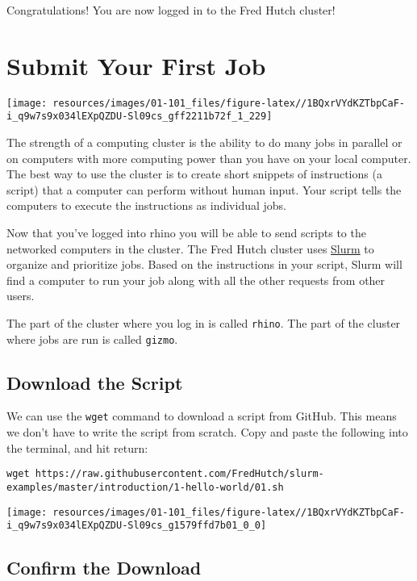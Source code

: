 \documentclass[
]{book}
\begin{document}
Congratulations! You are now logged in to the Fred Hutch cluster!

\hypertarget{submit-your-first-job}{%
\chapter{Submit Your First Job}\label{submit-your-first-job}}

\texttt{[image: resources/images/01-101\_files/figure-latex//1BQxrVYdKZTbpCaF-i\_q9w7s9x034lEXpQZDU-Sl09cs\_gff2211b72f\_1\_229]}

The strength of a computing cluster is the ability to do many jobs in parallel or on computers with more computing power than you have on your local computer. The best way to use the cluster is to create short snippets of instructions (a script) that a computer can perform without human input. Your script tells the computers to execute the instructions as individual jobs.

Now that you've logged into rhino you will be able to send scripts to the networked computers in the cluster. The Fred Hutch cluster uses \href{https://slurm.schedmd.com/overview.html}{Slurm} to organize and prioritize jobs. Based on the instructions in your script, Slurm will find a computer to run your job along with all the other requests from other users.

The part of the cluster where you log in is called \texttt{rhino}. The part of the cluster where jobs are run is called \texttt{gizmo}.

\hypertarget{download-the-script}{%
\section{Download the Script}\label{download-the-script}}

We can use the \texttt{wget} command to download a script from GitHub. This means we don't have to write the script from scratch. Copy and paste the following into the terminal, and hit return:

\begin{verbatim}
wget https://raw.githubusercontent.com/FredHutch/slurm-examples/master/introduction/1-hello-world/01.sh
\end{verbatim}

\texttt{[image: resources/images/01-101\_files/figure-latex//1BQxrVYdKZTbpCaF-i\_q9w7s9x034lEXpQZDU-Sl09cs\_g1579ffd7b01\_0\_0]}

\hypertarget{confirm-the-download}{%
\section{Confirm the Download}\label{confirm-the-download}}
\end{document}
